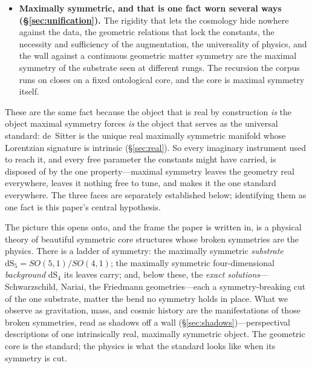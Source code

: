 \documentclass[11pt,a4paper]{article}
\theoremstyle{definition}
\begin{document}
\begin{itemize}
$(D-1)$-gon with the throat as its incircle, and of the equivalent statements
that hold at the hinge, two survive and three do not. The tangent length
equalling the hinge's height survives, because both are $\sqrt{R^{2}-\alpha^{2}}$
whatever the vertex distance $R$; so does the sides' touching the throat at
their midpoints, which is a property of any regular polygon's incircle. What
does not survive is the placement $R=2\alpha$, the $60^{\circ}$ subtense, and the
identification of the throat with the triangle's nine-point circle---the last
not because a number changes but because Euler's nine-point circle is a theorem
about triangles and has no analogue at a square. \emph{So the identity this
section rests on is the substrate's, and the classical relations that arrive
with it at four dimensions are the equilateral triangle's}~\cite{JanzenSlicing}.
They coincide there, which is why they read as one fact.
\item \textbf{Maximally symmetric, and that is one fact worn several ways
(\S\ref{sec:unification}).} The rigidity that lets the cosmology hide
nowhere against the data, the geometric relations that lock the constants,
the necessity and sufficiency of the augmentation, the universality of
physics, and the wall against a continuous geometric matter symmetry are the
maximal symmetry of the substrate seen at different rungs. The recursion the
corpus runs on closes on a fixed ontological core, and the core is maximal
symmetry itself.
\end{itemize}

\noindent These are the same fact because the object that is real by
construction \emph{is} the object maximal symmetry forces \emph{is} the
object that serves as the universal standard: de~Sitter is the unique real
maximally symmetric manifold whose Lorentzian signature is intrinsic
(\S\ref{sec:real}). So every imaginary instrument used to reach it, and
every free parameter the constants might have carried, is disposed of by the
one property---maximal symmetry leaves the geometry real everywhere, leaves
it nothing free to tune, and makes it the one standard everywhere.
The three faces are separately established below; identifying them as one
fact is this paper's central hypothesis.

The picture this opens onto, and the frame the paper is written in, is a
physical theory of beautiful symmetric core structures whose broken
symmetries are the physics. There is a ladder of symmetry: the
maximally symmetric \emph{substrate} $\mathrm{dS}_5=SO(5,1)/SO(4,1)$; the
maximally symmetric four-dimensional \emph{background} $\mathrm{dS}_4$ its
leaves carry; and, below these, the \emph{exact solutions}---Schwarzschild,
Nariai, the Friedmann geometries---each a symmetry-breaking cut of the one
substrate, matter the bend no symmetry holds in place. What we observe as
gravitation, mass, and cosmic history are the manifestations of those broken
symmetries, read as shadows off a wall (\S\ref{sec:shadows})---perspectival
descriptions of one intrinsically real, maximally symmetric object. The
geometric core is the standard; the physics is what the standard looks like
when its symmetry is cut.
\end{document}
